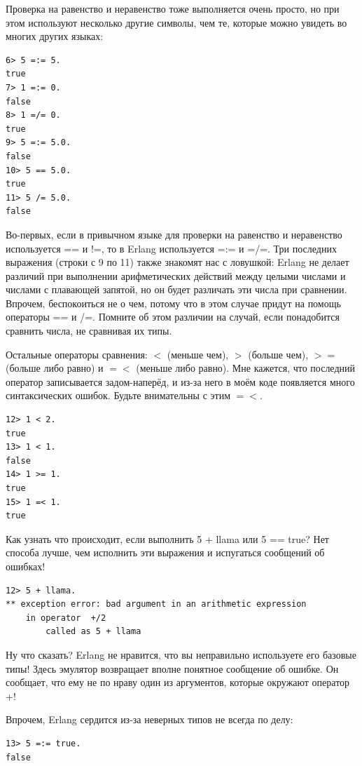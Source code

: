 \documentclass[a4paper,12pt]{report}
\newcommand{\ops}{\colorbox{lgreen}}
\begin{document}
Проверка на равенство и неравенство тоже выполняется очень просто, но при этом используют несколько другие символы, чем те, которые можно увидеть во многих других языках:
\begin{lstlisting}[style=repl]
6> 5 =:= 5.
true
7> 1 =:= 0.
false
8> 1 =/= 0.
true
9> 5 =:= 5.0.
false
10> 5 == 5.0.
true
11> 5 /= 5.0.
false
\end{lstlisting}

Во\--первых, если в привычном языке для проверки на равенство и неравенство используется \ops{==} и \ops{!=}, то в Erlang используется \ops{=:=} и \ops{=/=}. Три последних выражения (строки с 9 по 11) также знакомят нас с ловушкой: Erlang не делает различий при выполнении арифметических действий между целыми числами и числами с плавающей запятой, но он будет различать эти числа при сравнении. Впрочем, беспокоиться не о чем, потому что в этом случае придут на помощь операторы \ops{==} и \ops{/=}. Помните об этом различии на случай, если понадобится сравнить числа, не сравнивая их типы.

Остальные операторы сравнения: \ops{$<$} (меньше чем), \ops{$>$} (больше чем), \ops{$>=$} (больше либо равно) и \ops{$=<$} (меньше либо равно). Мне кажется, что последний оператор записывается задом\--наперёд, и из\--за него в моём коде появляется много синтаксических ошибок. Будьте внимательны с этим \ops{$=<$}.
\begin{lstlisting}[style=repl]
12> 1 < 2.
true
13> 1 < 1.
false
14> 1 >= 1.
true
15> 1 =< 1.
true
\end{lstlisting}

Как узнать что происходит, если выполнить \ops{5 + llama} или \ops{5 == true}? Нет способа лучше, чем исполнить эти выражения и испугаться сообщений об ошибках!
\begin{lstlisting}[style=repl]
12> 5 + llama.
** exception error: bad argument in an arithmetic expression
    in operator  +/2
        called as 5 + llama
\end{lstlisting}

Ну что сказать? Erlang не нравится, что вы неправильно используете его базовые типы! Здесь эмулятор возвращает вполне понятное сообщение об ошибке. Он сообщает, что ему не по нраву один из аргументов, которые окружают оператор \ops{+}!

Впрочем, Erlang сердится из\--за неверных типов не всегда по делу:
\begin{lstlisting}[style=repl]
13> 5 =:= true.
false
\end{lstlisting}
\end{document}
